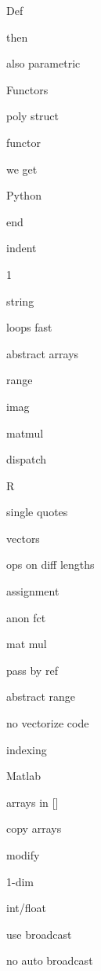 \documentclass[a5paper,12pt,DIV=14,footheight=-30pt, headheight=60pt, twoside=off]{scrartcl}
\newenvironment{sublist}[1][]{%
  \color{juliapurple}%
  \quad\begin{enumerate*}[#1]%
}%
{\end{enumerate*}}
\begin{document}
\begin{enumerate}[resume]
\begin{sublist}
        \item Def \item then \item also parametric
    \end{sublist}
    \item Functors
    \begin{sublist}
        \item poly struct
        \item functor
        \item we get
    \end{sublist}
    \item Python
    \begin{sublist}
        \item end\item indent \item 1 \item string \item loops fast
        \item abstract arrays \item range \item imag \item matmul \item dispatch
    \end{sublist}
    \item R
    \begin{sublist}
        \item single quotes \item vectors \item ops on diff lengths \item assignment
        \item anon fct \item mat mul \item pass by ref \item abstract range
        \item no vectorize code
        \item indexing
    \end{sublist}
    \item Matlab
    \begin{sublist}
        \item arrays in [] \item copy arrays \item modify \item 1-dim
        \item int/float
        \item use broadcast
        \item no auto broadcast
    \end{sublist}
\end{enumerate}
\end{document}
